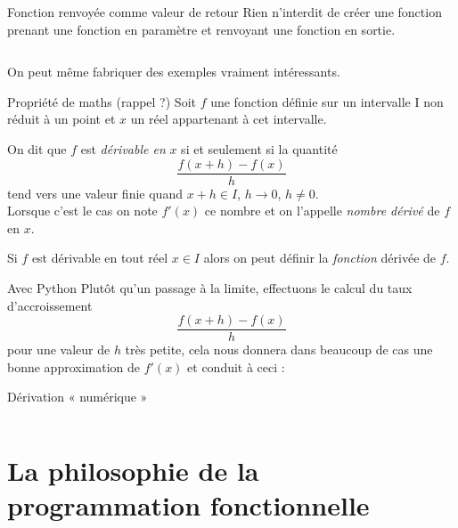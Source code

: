 \documentclass[10pt]{beamer}
\begin{document}
\begin{frame}[fragile]{Fonction renvoyée comme valeur de retour}
Rien n'interdit de créer une fonction prenant une fonction en paramètre et renvoyant une fonction en sortie.\pause
\inputminted{python}{scripts/func5.py}
\pause
On peut même fabriquer des exemples vraiment intéressants.
	
\end{frame}


\begin{frame}{Propriété de maths (rappel ?)}
Soit $f$ une fonction définie sur un intervalle I non réduit à un point et $x$ un réel appartenant à cet intervalle.\\\pause

On dit que $f$ est \textit{dérivable en} $x$ si et seulement si la quantité\pause
$$\dfrac{f(x+h)-f(x)}{h}$$\pause  tend vers une valeur finie quand $x+h\in I$, $h\to 0$, $h\neq 0$.\\\pause
Lorsque c'est le cas on note $f'(x)$ ce nombre et on l'appelle \textit{nombre dérivé} de $f$ en $x$.\\\pause

Si $f$ est dérivable en tout réel $x\in I$ alors on peut définir la \textit{fonction} dérivée de $f$.
\end{frame}

\begin{frame}{Avec Python}
Plutôt qu'un passage à la limite, effectuons le calcul du taux d'accroissement $$\dfrac{f(x+h)-f(x)}{h}$$ pour une valeur de $h$ très petite, cela nous donnera dans beaucoup de cas une bonne approximation de $f'(x)$ et conduit à ceci :
\end{frame}

\begin{frame}[fragile]{Dérivation « numérique »}
\inputminted{python}{scripts/func6.py}
\end{frame}


\section{La philosophie de la programmation fonctionnelle}
\end{document}
